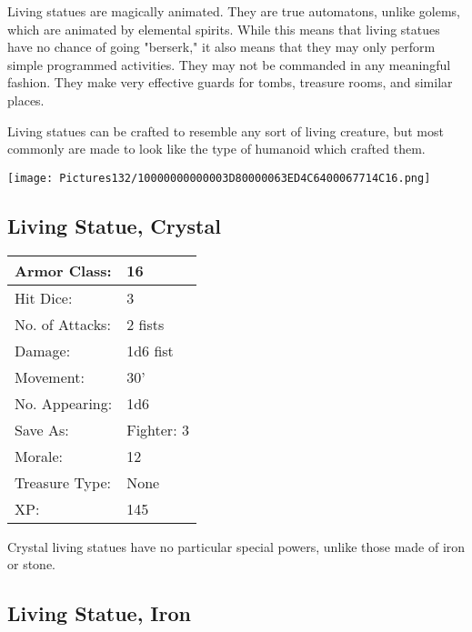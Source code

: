 \documentclass[a4paper,twoside,openany,10pt]{book}
\begin{document}
\begin{multicols}{2}
Living statues are magically animated. They are true automatons, unlike golems, which are animated by elemental spirits. While this means that living statues have no chance of going "berserk," it also means that they may only perform simple programmed activities. They may not be commanded in any meaningful fashion. They make very effective guards for tombs, treasure rooms, and similar places.

Living statues can be crafted to resemble any sort of living creature, but most commonly are made to look like the type of humanoid which crafted them.

\vfill

\begin{center} \texttt{[image: Pictures132/10000000000003D80000063ED4C6400067714C16.png]} \end{center}

\columnbreak


\subsection*{Living Statue, Crystal}\label{living-statue-crystal}

\begin{tabularx}{0.50\textwidth}{@{}lX@{}}
Armor Class: & 16 \\\hline
Hit Dice: & 3 \\\hline
No. of Attacks: & 2 fists \\\hline
Damage: & 1d6 fist \\\hline
Movement: & 30' \\\hline
No. Appearing: & 1d6 \\\hline
Save As: & Fighter: 3 \\\hline
Morale: & 12 \\\hline
Treasure Type: & None \\\hline
XP: & 145 \\\hline
\end{tabularx}\medskip

Crystal living statues have no particular special powers, unlike those made of iron or stone.

\subsection*{Living Statue, Iron}\label{living-statue-iron}


\end{multicols}
\end{document}
